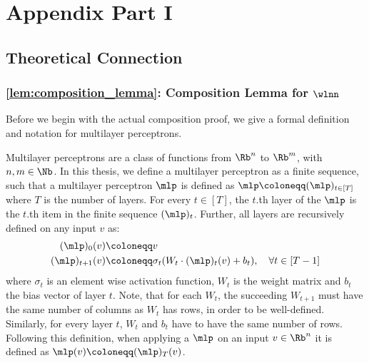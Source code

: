 \chapter{Appendix Part I}

\section{Theoretical Connection}

\subsection{\cref{lem:composition_lemma}: Composition Lemma for $\wlnn$}\label{app:composition_proof}
Before we begin with the actual composition proof, we give a formal definition and notation for multilayer perceptrons.

\begin{definition}\label{def:mlp}
    Multilayer perceptrons are a class of functions from $\Rb^n$ to $\Rb^m$, with $n,m \in \Nb$. In this thesis, we define a multilayer perceptron as a finite sequence, such that a multilayer perceptron $\mlp$ is defined as $\mlp \coloneqq (\mlp)_{t\in[T]}$ where $T$ is the number of layers. For every $t \in [T]$, the $t$.th layer of the $\mlp$ is the $t$.th item in the finite sequence $(\mlp)_t$. Further, all layers are recursively defined on any input $v$ as:
    \begin{align*}
        (\mlp)_{0}(v) &\coloneqq v\\
        (\mlp)_{t+1}(v) &\coloneqq \sigma_t(W_t \cdot (\mlp)_{t} (v) + b_t), \quad \forall t \in [T-1]
    \end{align*}
    where $\sigma_t$ is an element wise activation function, $W_t$ is the weight matrix and $b_t$ the bias vector of layer $t$. Note, that for each $W_t$, the succeeding $W_{t+1}$ must have the same number of columns as $W_t$ has rows, in order to be well-defined. Similarly, for every layer $t$, $W_t$ and $b_t$ have to have the same number of rows.
    Following this definition, when applying a $\mlp$ on an input $v \in \Rb^n$ it is defined as $\mlp(v) \coloneqq (\mlp)_T(v)$.
\end{definition}

